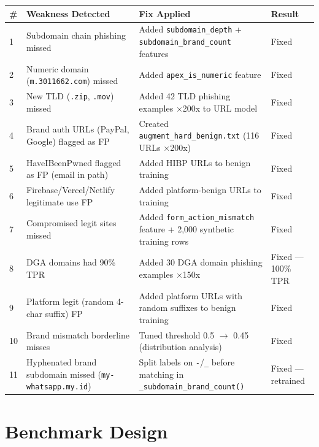\documentclass[11pt,a4paper]{article}
\newcommand{\code}[1]{\texttt{#1}}
\begin{document}
\begin{table}[h]
\centering
\small
\begin{tabularx}{\textwidth}{>{\raggedright}p{0.4cm}
                              >{\raggedright}p{3.8cm}
                              >{\raggedright}X
                              >{\raggedright\arraybackslash}p{3cm}}
\toprule
\# & Weakness Detected & Fix Applied & Result \\
\midrule
1 & Subdomain chain phishing missed &
    Added \code{subdomain\_depth} + \code{subdomain\_brand\_count}
    features & Fixed \\
2 & Numeric domain (\code{m.3011662.com}) missed &
    Added \code{apex\_is\_numeric} feature & Fixed \\
3 & New TLD (\code{.zip}, \code{.mov}) missed &
    Added 42 TLD phishing examples $\times$200x to URL model & Fixed \\
4 & Brand auth URLs (PayPal, Google) flagged as FP &
    Created \code{augment\_hard\_benign.txt} (116 URLs $\times$200x) &
    Fixed \\
5 & HaveIBeenPwned flagged as FP (email in path) &
    Added HIBP URLs to benign training & Fixed \\
6 & Firebase/Vercel/Netlify legitimate use FP &
    Added platform-benign URLs to training & Fixed \\
7 & Compromised legit sites missed &
    Added \code{form\_action\_mismatch} feature + 2,000 synthetic
    training rows & Fixed \\
8 & DGA domains had 90\% TPR &
    Added 30 DGA domain phishing examples $\times$150x & Fixed ---
    100\% TPR \\
9 & Platform legit (random 4-char suffix) FP &
    Added platform URLs with random suffixes to benign training &
    Fixed \\
10 & Brand mismatch borderline misses &
    Tuned threshold 0.5 $\rightarrow$ 0.45 (distribution analysis) &
    Fixed \\
11 & Hyphenated brand subdomain missed
    (\code{my-whatsapp.my.id}) &
    Split labels on \code{-}/\code{\_} before matching in
    \code{\_subdomain\_brand\_count()} & Fixed --- retrained \\
\bottomrule
\end{tabularx}
\end{table}

\section{Benchmark Design}
\end{document}
